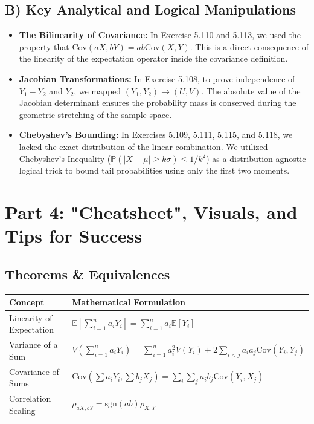 \documentclass[11pt, a4paper]{article}
\theoremstyle{definition}
\theoremstyle{remark}
\newcommand{\E}{\mathbb{E}}
\newcommand{\Prob}{\mathbb{P}}
\begin{document}
\subsection{B) Key Analytical and Logical Manipulations}
\begin{itemize}
    \item \textbf{The Bilinearity of Covariance:} In Exercise 5.110 and 5.113, we used the property that $\text{Cov}(aX, bY) = ab\text{Cov}(X,Y)$. This is a direct consequence of the linearity of the expectation operator inside the covariance definition.
    \item \textbf{Jacobian Transformations:} In Exercise 5.108, to prove independence of $Y_1-Y_2$ and $Y_2$, we mapped $(Y_1, Y_2) \to (U, V)$. The absolute value of the Jacobian determinant ensures the probability mass is conserved during the geometric stretching of the sample space.
    \item \textbf{Chebyshev's Bounding:} In Exercises 5.109, 5.111, 5.115, and 5.118, we lacked the exact distribution of the linear combination. We utilized Chebyshev's Inequality ($\Prob(|X-\mu| \ge k\sigma) \le 1/k^2$) as a distribution-agnostic logical trick to bound tail probabilities using only the first two moments.
\end{itemize}

\newpage
\section{Part 4: "Cheatsheet", Visuals, and Tips for Success}

\subsection{Theorems \& Equivalences}
\renewcommand{\arraystretch}{1.5}
\begin{tabularx}{\textwidth}{>{\hsize=0.3\hsize}X >{\hsize=0.7\hsize}X}
\toprule
\textbf{Concept} & \textbf{Mathematical Formulation} \\
\midrule
Linearity of Expectation & $\E\left[\sum_{i=1}^n a_i Y_i\right] = \sum_{i=1}^n a_i \E[Y_i]$ \\
\addlinespace[4pt]
Variance of a Sum & $V\left(\sum_{i=1}^n a_i Y_i\right) = \sum_{i=1}^n a_i^2 V(Y_i) + 2 \sum_{i < j} a_i a_j \text{Cov}(Y_i, Y_j)$ \\
\addlinespace[4pt]
Covariance of Sums & $\text{Cov}\left(\sum a_i Y_i, \sum b_j X_j\right) = \sum_i \sum_j a_i b_j \text{Cov}(Y_i, X_j)$ \\
\addlinespace[4pt]
Correlation Scaling & $\rho_{aX, bY} = \text{sgn}(ab) \rho_{X, Y}$ \\
\bottomrule
\end{tabularx}
\end{document}
